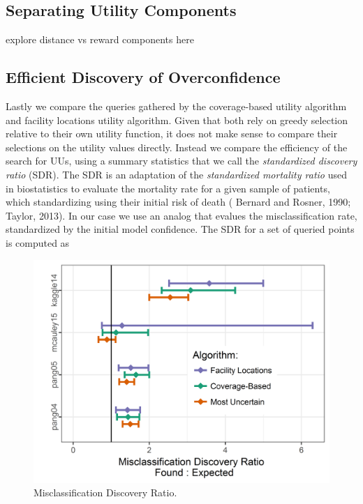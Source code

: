 \documentclass[letterpaper]{article} %
\newcommand{\km}[1]{{\color{red} #1}} %
\begin{document}
\subsection{Separating Utility Components}
 
\km{explore distance vs reward components here}

\subsection{Efficient Discovery of Overconfidence}

Lastly we compare the queries gathered by the coverage-based utility algorithm and facility locations utility algorithm. Given that both rely on greedy selection relative to their own utility function, it does not make sense to compare their selections on the utility values directly. Instead we compare the efficiency of the search for UUs, using a summary statistics that we call the \textit{standardized discovery ratio} (SDR). The SDR is an adaptation of the \textit{standardized mortality ratio} used in biostatistics to evaluate the mortality rate for a given sample of patients, which standardizing using their initial risk of death (\km{Bernard and Rosner, 1990; Taylor, 2013}). In our case we use an analog that evalues the misclassification rate, standardized by the initial model confidence. The SDR for a set of queried points is computed as



\begin{figure}[hbtp]
  \includegraphics[width=.49\textwidth]{../experimentsAndPlots/discoveryRatioPlaceholder.png}
  \caption{Misclassification Discovery Ratio.}
  \label{fig:sdr}
\end{figure}
\end{document}
